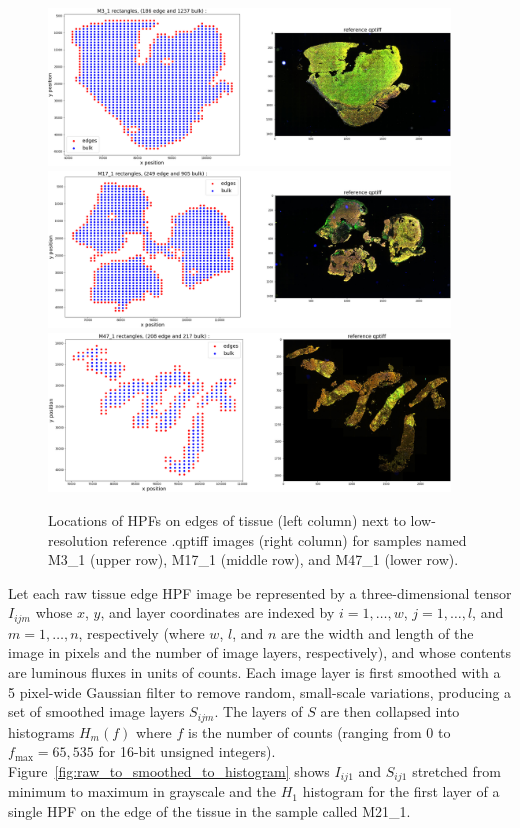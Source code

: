 \documentclass[letterpaper,11pt]{article}
\newcommand{\reffig}[1]{Figure~\ref{#1}}
\newcommand{\fmax}{f_{\mathrm{max}}}
\begin{document}
\begin{figure}[!ht]
\centering
\includegraphics[width=0.95\textwidth]{images/masking/rectangle_locations_M3_1}
\includegraphics[width=0.95\textwidth]{images/masking/rectangle_locations_M17_1}
\includegraphics[width=0.95\textwidth]{images/masking/rectangle_locations_M47_1}
\caption{\footnotesize Locations of HPFs on edges of tissue (left column) next to low-resolution reference .qptiff images (right column) for samples named M3\_1 (upper row), M17\_1 (middle row), and M47\_1 (lower row). }
\label{fig:edge_HPFs}
\end{figure}

Let each raw tissue edge HPF image be represented by a three-dimensional tensor $I_{ijm}$ whose $x$, $y$, and layer coordinates are indexed by $i=1,\ldots,w$, $j=1,\ldots,l$, and $m=1,\ldots,n$, respectively (where $w$, $l$, and $n$ are the width and length of the image in pixels and the number of image layers, respectively), and whose contents are luminous fluxes in units of counts. Each image layer is first smoothed with a 5 pixel-wide Gaussian filter to remove random, small-scale variations, producing a set of smoothed image layers $S_{ijm}$. The layers of $S$ are then collapsed into histograms $H_{m}(f)$ where $f$ is the number of counts (ranging from 0 to $\fmax=65,535$ for 16-bit unsigned integers). \reffig{fig:raw_to_smoothed_to_histogram} shows $I_{ij1}$ and $S_{ij1}$ stretched from minimum to maximum in grayscale and the $H_{1}$ histogram for the first layer of a single HPF on the edge of the tissue in the sample called M21\_1. 
\end{document}
